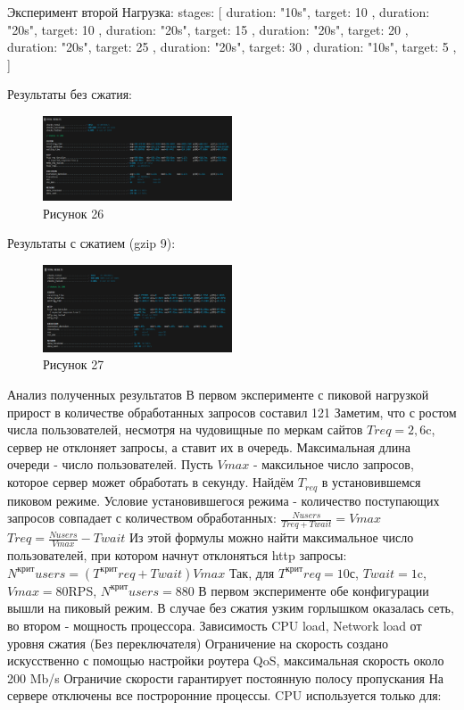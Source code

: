\documentclass[12pt]{article}
\begin{document}
    Эксперимент второй
    Нагрузка:
    stages: [
    { duration: "10s", target: 10 },
    { duration: "20s", target: 10 },
    { duration: "20s", target: 15 },
    { duration: "20s", target: 20 },
    { duration: "20s", target: 25 },
    { duration: "20s", target: 30 },
    { duration: "10s", target: 5 },
    ]

    Результаты без сжатия:
    \begin{figure}[h!]
        \centering
        \includegraphics[width=0.5\textwidth]{../images/no-compress_exp2_k6screen.png}
        \caption{Рисунок 26}
    \end{figure}

    Результаты с сжатием (gzip 9):
    \begin{figure}[h!]
        \centering
        \includegraphics[width=0.5\textwidth]{../images/gzip9_exp2_k6screen.png}
        \caption{Рисунок 27}
    \end{figure}

    Анализ полученных результатов
    В первом эксперименте с пиковой нагрузкой прирост в количестве обработанных запросов составил 121%
    Заметим, что с ростом числа пользователей, несмотря на чудовищные по меркам сайтов $T{req}=2,6$c, сервер не отклоняет запросы, а ставит их в очередь. Максимальная длина очереди - число пользователей. Пусть $V{max}$ - максильное число запросов, которое сервер может обработать в секунду. Найдём $T_{req}$ в установившемся пиковом режиме. Условие установившегося режима - количество поступающих запросов совпадает с количеством обработанных:
$\frac{N{users}}{T{req} + T{wait}}=V{max}$
$T{req} = \frac{N{users}}{V{max}} - T{wait}$
    Из этой формулы можно найти максимальное число пользователей, при котором начнут отклоняться http запросы:
$N^{крит}{users} = (T^{крит}{req} + T{wait}){V{max}}$
    Так, для $T^{крит}{req} = 10$с, $T{wait}=1$c, $V{max}=80$RPS, $N^{крит}{users}=880$
    В первом эксперименте обе конфигурации вышли на пиковый режим. В случае без сжатия узким горлышком оказалась сеть, во втором - мощность процессора.
    Зависимость CPU load, Network load от уровня сжатия (Без переключателя)
    Ограничение на скорость создано искусственно с помощью настройки роутера QoS, максимальная скорость около 200 Mb/s
    Ограничие скорости гарантирует постоянную полосу пропускания
    На сервере отключены все построронние процессы. CPU используется только для:
\end{document}

